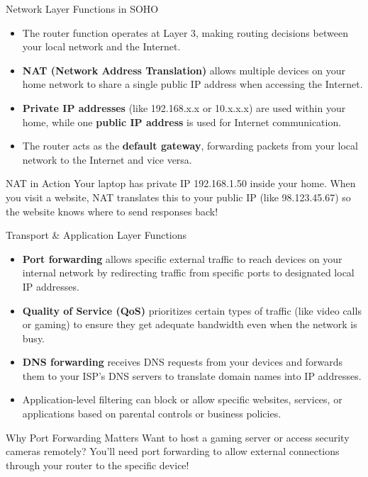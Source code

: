 \documentclass[aspectratio=169]{beamer}
\begin{document}
\begin{frame}{Network Layer Functions in SOHO}

\begin{itemize}
    \item The router function operates at Layer 3, making routing decisions between your local network and the Internet.
    \item \textbf{NAT (Network Address Translation)} allows multiple devices on your home network to share a single public IP address when accessing the Internet.
    \item \textbf{Private IP addresses} (like 192.168.x.x or 10.x.x.x) are used within your home, while one \textbf{public IP address} is used for Internet communication.
    \item The router acts as the \textbf{default gateway}, forwarding packets from your local network to the Internet and vice versa.
\end{itemize}

\vspace{0.3cm}

\begin{block}{NAT in Action}
Your laptop has private IP 192.168.1.50 inside your home. When you visit a website, NAT translates this to your public IP (like 98.123.45.67) so the website knows where to send responses back!
\end{block}

\end{frame}

\begin{frame}{Transport \& Application Layer Functions}

\begin{itemize}
    \item \textbf{Port forwarding} allows specific external traffic to reach devices on your internal network by redirecting traffic from specific ports to designated local IP addresses.
    \item \textbf{Quality of Service (QoS)} prioritizes certain types of traffic (like video calls or gaming) to ensure they get adequate bandwidth even when the network is busy.
    \item \textbf{DNS forwarding} receives DNS requests from your devices and forwards them to your ISP's DNS servers to translate domain names into IP addresses.
    \item Application-level filtering can block or allow specific websites, services, or applications based on parental controls or business policies.
\end{itemize}

\vspace{0.3cm}

\begin{alertblock}{Why Port Forwarding Matters}
Want to host a gaming server or access security cameras remotely? You'll need port forwarding to allow external connections through your router to the specific device!
\end{alertblock}

\end{frame}
\end{document}
